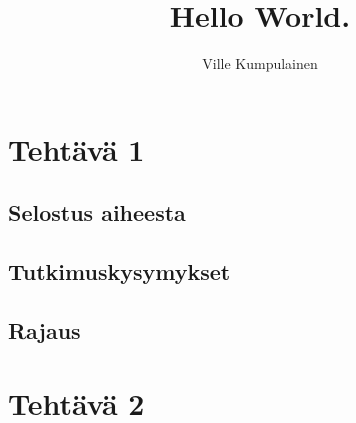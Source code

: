 \documentclass{article}
\title{Hello World.}
\author{Ville Kumpulainen}
\begin{document}

\tableofcontents
\newpage

\section{Tehtävä 1}
\subsection{Selostus aiheesta}


\subsection{Tutkimuskysymykset}


\subsection{Rajaus}


\section{Tehtävä 2}

\end{document}
